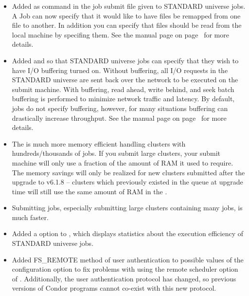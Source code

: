 \begin{itemize}

\item Added  as command in the job submit file given to
STANDARD universe jobs.
A Job can now specify that it would like to have files be remapped
from one file to another.
In addition you can specify that files should be read from the local machine
by specifing them.
See the  manual page on page~\pageref{man-condor-submit} for
more details.

\item Added  and  so that STANDARD
universe jobs can specify that they wish to have I/O buffering turned on.
Without buffering, all I/O requests in the STANDARD universe are sent back
over the network to be executed on the submit machine.  
With buffering, read ahead, write behind, and seek batch buffering is
performed to minimize network traffic and latency.
By default, jobs do not specify buffering, however, for many situations buffering
can drastically increase throughput.  See the  manual page
on page~\pageref{man-condor-submit} for more details.

\item The  is much more memory efficient handling clusters
with hundreds/thousands of jobs.  
If you submit large clusters, your submit machine will only use a fraction
of the amount of RAM it used to require.  
\Note The memory savings will only be realized for new clusters submitted
after the upgrade to v6.1.8 -- clusters which previously existed in the
queue at upgrade time will still use the same amount of RAM in the
.

\item Submitting jobs, especially submitting large clusters containing many
jobs, is much faster.

\item Added a  option to , which displays
statistics about the execution efficiency of STANDARD universe jobs.

\item Added FS\_REMOTE method of user authentication to possible values
of the configuration option  to fix problems
with using the  remote scheduler option of .
Additionally, the user authentication protocol has changed, so previous
versions of Condor programs cannot co-exist with this new protocol.


\end{itemize}
